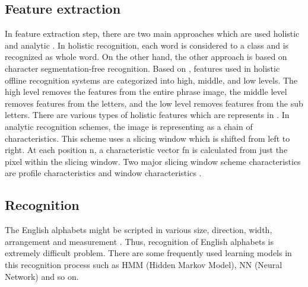 \subsection{Feature extraction}
In feature extraction step, there are two main approaches which are used holistic and analytic \cite{12}. In holistic recognition, each word is considered to a class and is recognized as whole word. On the other hand, the other approach is based on character segmentation-free recognition.
Based on \cite{12}, features used in holistic offline recognition systems are categorized into high,
middle, and low levels. The high level removes the features from the entire phrase image, the middle level removes features from the letters, and the low level removes features from the sub letters. There are various types of holistic features which are represents in \cite{12}.
In analytic recognition schemes, the image is representing as a chain of characteristics. This scheme uses a slicing window which is shifted from left to right. At each position n, a characteristic vector fn is calculated from just the pixel within the slicing window. Two major slicing window scheme characteristics are profile characteristics and window characteristics \cite{12}.
\subsection{Recognition}
The English alphabets might be scripted in various size, direction, width, arrangement and measurement \cite{12}. Thus, recognition of English alphabets is extremely difficult problem. There are some frequently used learning models in this recognition process such as HMM (Hidden Markov Model), NN (Neural Network) and so on.